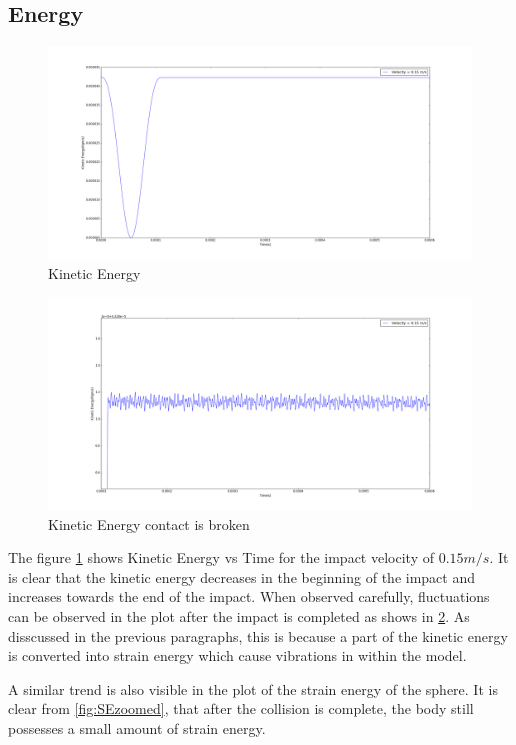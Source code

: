 \subsection{Energy}
\begin{figure}[H]
\includegraphics[width=1.0\textwidth]{../images/KE/KE.png}
\caption{Kinetic Energy}
\label{fig:KE}
\end{figure}
\begin{figure}[H]
\includegraphics[width=1.0\textwidth]{../images/KE/KE-zoomed.png}
\caption{Kinetic Energy contact is broken}
\label{fig:KEzoomed}
\end{figure}
The figure \ref{fig:KE} shows Kinetic Energy vs Time for the impact velocity of $0.15m/s$. It is clear that the kinetic energy decreases in the beginning of the impact and increases towards the end of the impact. When observed carefully, fluctuations can be observed in the plot after the impact is completed as shows in \ref{fig:KEzoomed}. As disscussed in the previous paragraphs, this is because a part of the kinetic energy is converted into strain energy which cause vibrations in within the model.

A similar trend is also visible in the plot of the strain energy of the sphere. It is clear from \ref{fig:SEzoomed}, that after the collision is complete, the body still possesses a small amount of strain energy.

